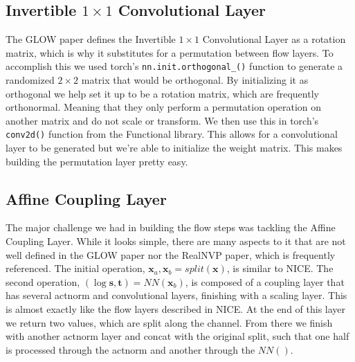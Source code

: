 \subsection{Invertible $1\times 1$ Convolutional Layer}
%
The GLOW paper defines the Invertible $1\times 1$ Convolutional
Layer as a rotation matrix, which is why it substitutes for a permutation
between flow layers. To accomplish this we used torch's 
\lstinline[basicstyle=\ttfamily]|nn.init.orthogonal_()| function to generate a
randomized $2\times 2$ matrix that would be orthogonal. By initializing it as
orthogonal we help set it up to be a rotation matrix, which are frequently
orthonormal. Meaning that they only perform a permutation operation on another
matrix and do not scale or transform. We then use this in torch's
\lstinline[basicstyle=\ttfamily]|conv2d()| function from the Functional library.
This allows for a convolutional layer to be generated but we're able to
initialize the weight matrix. This makes building the permutation layer pretty
easy. 

\subsection{Affine Coupling Layer}
%
The major challenge we had in building the flow steps was tackling the
Affine Coupling Layer. While it looks simple, there are many aspects to it that
are not well defined in the GLOW paper nor the RealNVP paper, which is
frequently referenced. The initial operation, $\mathbf{x}_a, \mathbf{x}_b =
split(\mathbf{x})$, is similar to NICE. The second operation,
$(\log{\mathbf{s}}, \mathbf{t}) = NN(\mathbf{x}_b)$, is composed of a coupling
layer that has several actnorm and convolutional layers, finishing with a
scaling layer. This is almost exactly like the flow layers described in NICE. At
the end of this layer we return two values, which are split along the channel.
From there we finish with another actnorm layer and concat with the original
split, such that one half is processed through the actnorm and another through
the $NN()$.


